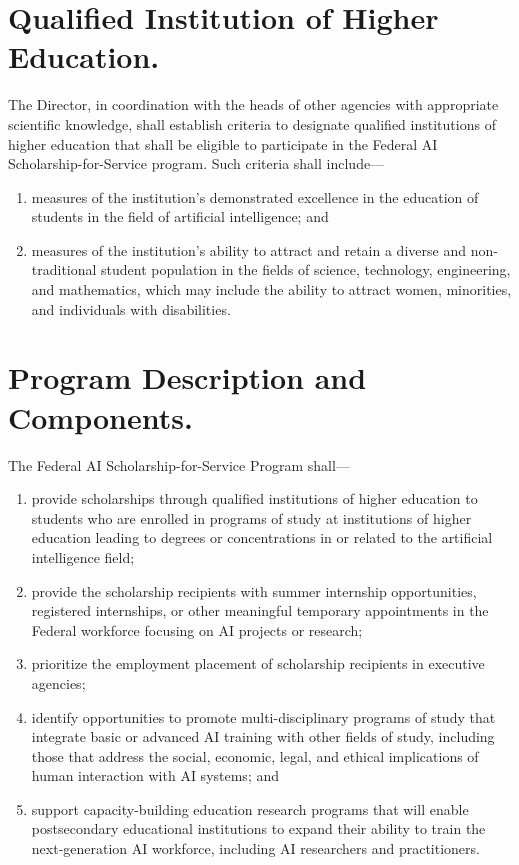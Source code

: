 \documentclass{article}
\begin{document}
    \section{Qualified Institution of Higher Education.}The Director, in 
coordination with the heads of other agencies with appropriate 
scientific knowledge, shall establish criteria to designate qualified 
institutions of higher education that shall be eligible to participate 
in the Federal AI Scholarship-for-Service program. Such criteria shall 
include---
\begin{enumerate}
            \item measures of the institution's demonstrated excellence 
        in the education of students in the field of artificial 
        intelligence; and
            \item measures of the institution's ability to attract and 
        retain a diverse and non-traditional student population in the 
        fields of science, technology, engineering, and mathematics, 
        which may include the ability to attract women, minorities, and 
        individuals with disabilities.
\end{enumerate}
    \section{Program Description and Components.}\label{sec:program}The Federal AI 
Scholarship-for-Service Program shall---
\begin{enumerate}
            \item provide scholarships through qualified institutions of 
        higher education to students who are enrolled in programs of 
        study at institutions of higher education leading to degrees or 
        concentrations in or related to the artificial intelligence 
        field;
            \item provide the scholarship recipients with summer 
        internship opportunities, registered internships, or other 
        meaningful temporary appointments in the Federal workforce 
        focusing on AI projects or research;
            \item prioritize the employment placement of scholarship 
        recipients in executive agencies;
            \item identify opportunities to promote multi-disciplinary 
        programs of study that integrate basic or advanced AI training 
        with other fields of study, including those that address the 
        social, economic, legal, and ethical implications of human 
        interaction with AI systems; and
            \item support capacity-building education research programs 
        that will enable postsecondary educational institutions to 
        expand their ability to train the next-generation AI workforce, 
        including AI researchers and practitioners.
\end{enumerate}
\end{document}
